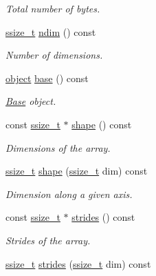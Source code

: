 \begin{DoxyCompactItemize}
\begin{DoxyCompactList}\small\item\em Total number of bytes. \end{DoxyCompactList}\item 
\mbox{\hyperlink{detail_2common_8h_ac430d16fc097b3bf0a7469cfd09decda}{ssize\+\_\+t}} \mbox{\hyperlink{classarray_a184360492eac7224753f132d1a0a973e}{ndim}} () const
\begin{DoxyCompactList}\small\item\em Number of dimensions. \end{DoxyCompactList}\item 
\mbox{\hyperlink{classobject}{object}} \mbox{\hyperlink{classarray_a33a2f2933da6ca35a8ac82709df90038}{base}} () const
\begin{DoxyCompactList}\small\item\em \mbox{\hyperlink{struct_base}{Base}} object. \end{DoxyCompactList}\item 
const \mbox{\hyperlink{detail_2common_8h_ac430d16fc097b3bf0a7469cfd09decda}{ssize\+\_\+t}} $\ast$ \mbox{\hyperlink{classarray_a084781a3d2cb3ea60ab7bcf16c30ee31}{shape}} () const
\begin{DoxyCompactList}\small\item\em Dimensions of the array. \end{DoxyCompactList}\item 
\mbox{\hyperlink{detail_2common_8h_ac430d16fc097b3bf0a7469cfd09decda}{ssize\+\_\+t}} \mbox{\hyperlink{classarray_aceb118afe3a4eed2b3c9ec958505e414}{shape}} (\mbox{\hyperlink{detail_2common_8h_ac430d16fc097b3bf0a7469cfd09decda}{ssize\+\_\+t}} dim) const
\begin{DoxyCompactList}\small\item\em Dimension along a given axis. \end{DoxyCompactList}\item 
const \mbox{\hyperlink{detail_2common_8h_ac430d16fc097b3bf0a7469cfd09decda}{ssize\+\_\+t}} $\ast$ \mbox{\hyperlink{classarray_a3dd7d4e8f6d93e5714a642a3250df6e3}{strides}} () const
\begin{DoxyCompactList}\small\item\em Strides of the array. \end{DoxyCompactList}\item 
\mbox{\hyperlink{detail_2common_8h_ac430d16fc097b3bf0a7469cfd09decda}{ssize\+\_\+t}} \mbox{\hyperlink{classarray_afb8e09341f7884d6b34d454b2992c7ce}{strides}} (\mbox{\hyperlink{detail_2common_8h_ac430d16fc097b3bf0a7469cfd09decda}{ssize\+\_\+t}} dim) const

\end{DoxyCompactItemize}
